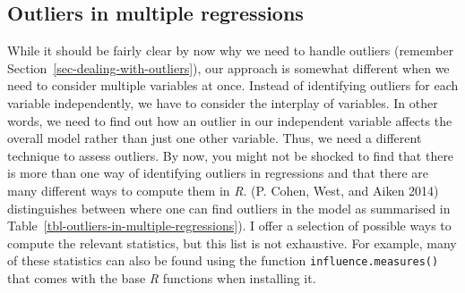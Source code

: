 \documentclass[
  letterpaper,
]{krantz}
\begin{document}
\subsection{Outliers in multiple
regressions}\label{sec-outliers-in-multiple-regressions}

While it should be fairly clear by now why we need to handle outliers
(remember Section~\ref{sec-dealing-with-outliers}), our approach is
somewhat different when we need to consider multiple variables at once.
Instead of identifying outliers for each variable independently, we have
to consider the interplay of variables. In other words, we need to find
out how an outlier in our independent variable affects the overall model
rather than just one other variable. Thus, we need a different technique
to assess outliers. By now, you might not be shocked to find that there
is more than one way of identifying outliers in regressions and that
there are many different ways to compute them in \emph{R}. (P. Cohen,
West, and Aiken 2014) distinguishes between where one can find outliers
in the model as summarised in
Table~\ref{tbl-outliers-in-multiple-regressions}). I offer a selection
of possible ways to compute the relevant statistics, but this list is
not exhaustive. For example, many of these statistics can also be found
using the function \texttt{influence.measures()} that comes with the
base \emph{R} functions when installing it.
\end{document}
